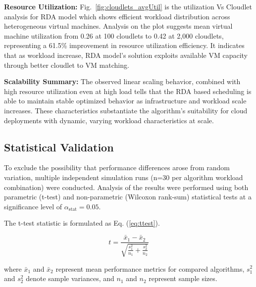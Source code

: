 \documentclass[pdflatex,sn-mathphys-num]{sn-jnl}%
\begin{document}
\textbf{Resource Utilization:} Fig.~\ref{fig:cloudlets_avgUtil} is the utilization Vs Cloudlet analysis for RDA model which shows efficient workload distribution across heterogeneous virtual machines. Analysis on the plot suggests mean virtual machine utilization from 0.26 at 100 cloudlets to 0.42 at 2,000 cloudlets, representing a 61.5\% improvement in resource utilization efficiency. It indicates that as workload increase, RDA model's solution exploits available VM capacity through better cloudlet to VM matching.

\textbf{Scalability Summary:} The observed linear scaling behavior, combined with high resource utilization even at high load tells that the RDA based scheduling is able to maintain stable optimized behavior as infrastructure and workload scale increases. These characteristics substantiate the algorithm's suitability for cloud deployments with dynamic, varying workload characteristics at scale.

\subsection{Statistical Validation}\label{subsec6.6}

To exclude the possibility that performance differences arose from random variation, multiple independent simulation runs (n=30 per algorithm workload combination) were conducted. Analysis of the results were performed using both parametric (t-test) and non-parametric (Wilcoxon rank-sum) statistical tests at a significance level of $\alpha_{\text{stat}} = 0.05$.

The t-test statistic is formulated as Eq. (\ref{eq:ttest}).

\begin{equation}\label{eq:ttest}
t = \frac{\bar{x}_1 - \bar{x}_2}{\sqrt{\frac{s_1^2}{n_1} + \frac{s_2^2}{n_2}}}
\end{equation}

where $\bar{x}_1$ and $\bar{x}_2$ represent mean performance metrics for compared algorithms, $s_1^2$ and $s_2^2$ denote sample variances, and $n_1$ and $n_2$ represent sample sizes.
\end{document}

